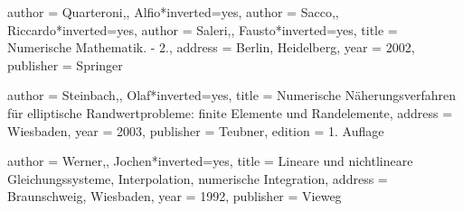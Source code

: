 \begin{bibdiv}
\begin{biblist}
 {
    author = {{Quarteroni,}, Alfio}*{inverted={yes}},
    author = {{Sacco,}, Riccardo}*{inverted={yes}},
    author = {{Saleri,}, Fausto}*{inverted={yes}},
    title = {Numerische Mathematik. - 2.},
    address = {Berlin, Heidelberg},
    year = {2002},
    publisher = {Springer}
}


 {
    author = {{Steinbach,}, Olaf}*{inverted={yes}},
    title = {Numerische Näherungsverfahren für elliptische Randwertprobleme: finite Elemente und Randelemente},
    address = {Wiesbaden},
    year = {2003},
    publisher = {Teubner},
    edition = {1. Auflage}
}

 {
    author = {{Werner,}, Jochen}*{inverted={yes}},
    title = {Lineare und nichtlineare Gleichungssysteme, Interpolation, numerische Integration},
    address = {Braunschweig, Wiesbaden},
    year = {1992},
    publisher = {Vieweg}
}

\end{biblist}
\end{bibdiv}
